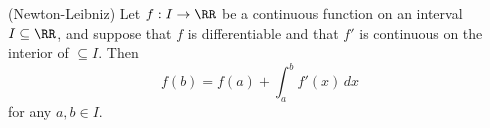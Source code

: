 

\begin{theorem}
(Newton-Leibniz) Let $f: I\to \RR $ be a continuous function on 
an interval $I\subseteq \RR$, and suppose that $f$ is differentiable 
and that $f'$ is continuous on the interior of $\subseteq I$. Then
$$
f(b) = f(a) + \int_a^b f'(x)\,dx
$$
for any $a, b\in I$.
\end{theorem}

